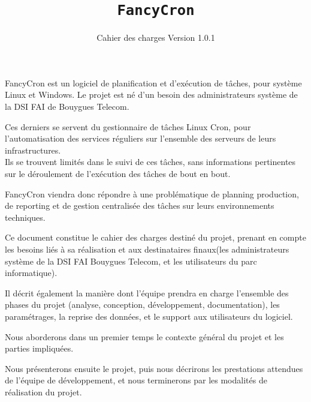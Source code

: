 \documentclass{bouygues-fr}
\begin{document}
\title{\texttt{FancyCron}}
\subtitle{Cahier des charges Version 1.0.1}



\summary
{
  FancyCron est un logiciel de planification et d'exécution de tâches, pour système Linux et Windows. Le projet est né d'un besoin des administrateurs système de la DSI FAI de Bouygues Telecom.

  Ces derniers se servent du gestionnaire de tâches Linux Cron, pour l'automatisation des services réguliers sur l'ensemble des serveurs de leurs infrastructures.\\
  Ils se trouvent limités dans le suivi de ces tâches, sans informations pertinentes sur le déroulement de l'exécution des tâches de bout en bout.

  FancyCron viendra donc répondre à une problématique de planning production, de reporting et de gestion centralisée des tâches sur leurs environnements techniques. 

  Ce document constitue le cahier des charges destiné du projet, prenant en compte les besoins liés à sa réalisation et aux destinataires finaux(les administrateurs  système de la DSI FAI Bouygues  Telecom, et les utilisateurs du parc informatique).

  Il décrit également la manière dont l’équipe prendra en charge l’ensemble des phases du projet (analyse, conception, développement, documentation), les paramétrages, la reprise des données, et le support aux utilisateurs du logiciel.

  Nous  aborderons  dans  un  premier  temps  le  contexte  général  du  projet et  les  parties impliquées.

  Nous présenterons ensuite le projet, puis nous décrirons les prestations attendues de l’équipe de développement, et nous terminerons par les modalités de réalisation du projet.
}

\maketitle

\tableofcontents

\renewcommand{\labelitemi}{$\bullet$}
\renewcommand{\labelitemii}{$\circ$}

\newpage
\end{document}
